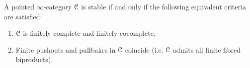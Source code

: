                 \begin{proposition} \label{prop: stability_criteria_for_pointed_infinity_categories} 
                    A pointed $\infty$-category $\mathcal{C}$ is stable if and only if the following equivalent criteria are satisfied:
                        \begin{enumerate}
                            \item $\mathcal{C}$ is finitely complete and finitely cocomplete.
                            \item Finite pushouts and pullbakcs in $\mathcal{C}$ coincide (i.e. $\mathcal{C}$ admits all finite fibred biproducts).
                        \end{enumerate}
                \end{proposition}
